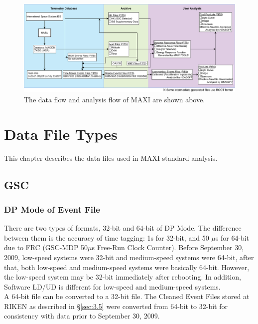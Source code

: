 \documentclass[10pt]{report}
\renewcommand{\_}{\textscale{.5}{\textbf{\textunderscore}}}
\begin{document}
\begin{figure}[hbtp!]
  \centering
  \includegraphics[width=1\textwidth]{1_1.pdf}
  \caption{The data flow and analysis flow of MAXI are shown above.}
  \label{fig:1.1}
\end{figure}

\clearpage

\chapter{Data File Types}\label{ch:2}

This chapter describes the data files used in MAXI standard analysis.\\

\section{GSC}\label{sec:2.1}

\subsection{DP Mode of Event File}\label{subsec:2.1.1}

There are two types of formats, 32-bit and 64-bit of DP Mode. The difference between them is the accuracy of time tagging: 1s for 32-bit, and 50 $\mu$s for 64-bit due to FRC (GSC-MDP 50$\mu$s Free-Run Clock Counter). Before September 30, 2009, low-speed systems were 32-bit and medium-speed systems were 64-bit, after that, both low-speed and medium-speed systems were basically 64-bit. However, the low-speed system may be 32-bit immediately after rebooting. In addition, Software LD/UD is different for low-speed and medium-speed systems. \\
\indent A 64-bit file can be converted to a 32-bit file. The Cleaned Event Files stored at RIKEN as described in \S\ref{sec:3.5} were converted from 64-bit to 32-bit for consistency with data prior to September 30, 2009. \\
\end{document}
